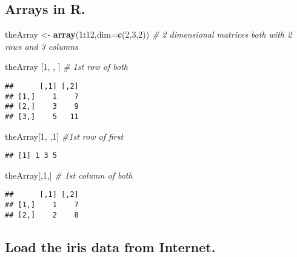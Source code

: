 \documentclass[
]{article}
\newenvironment{Shaded}{\begin{snugshade}}{\end{snugshade}}
\newcommand{\AttributeTok}[1]{\textcolor[rgb]{0.13,0.29,0.53}{#1}}
\newcommand{\CommentTok}[1]{\textcolor[rgb]{0.56,0.35,0.01}{\textit{#1}}}
\newcommand{\DecValTok}[1]{\textcolor[rgb]{0.00,0.00,0.81}{#1}}
\newcommand{\FunctionTok}[1]{\textcolor[rgb]{0.13,0.29,0.53}{\textbf{#1}}}
\newcommand{\NormalTok}[1]{#1}
\newcommand{\OtherTok}[1]{\textcolor[rgb]{0.56,0.35,0.01}{#1}}
\newcommand{\SpecialCharTok}[1]{\textcolor[rgb]{0.81,0.36,0.00}{\textbf{#1}}}
\begin{document}
\subsection{Arrays in R.}\label{arrays-in-r.}

\begin{Shaded}
\begin{Highlighting}[]
\NormalTok{theArray }\OtherTok{\textless{}{-}} \FunctionTok{array}\NormalTok{(}\DecValTok{1}\SpecialCharTok{:}\DecValTok{12}\NormalTok{,}\AttributeTok{dim=}\FunctionTok{c}\NormalTok{(}\DecValTok{2}\NormalTok{,}\DecValTok{3}\NormalTok{,}\DecValTok{2}\NormalTok{))}
\CommentTok{\# 2 dimensional matrices both with 2 rows and 3 columns}

\NormalTok{theArray [}\DecValTok{1}\NormalTok{, , ] }\CommentTok{\# 1st row of both}
\end{Highlighting}
\end{Shaded}

\begin{verbatim}
##      [,1] [,2]
## [1,]    1    7
## [2,]    3    9
## [3,]    5   11
\end{verbatim}

\begin{Shaded}
\begin{Highlighting}[]
\NormalTok{theArray[}\DecValTok{1}\NormalTok{, ,}\DecValTok{1}\NormalTok{] }\CommentTok{\#1st row of first}
\end{Highlighting}
\end{Shaded}

\begin{verbatim}
## [1] 1 3 5
\end{verbatim}

\begin{Shaded}
\begin{Highlighting}[]
\NormalTok{theArray[,}\DecValTok{1}\NormalTok{,] }\CommentTok{\# 1st column of both}
\end{Highlighting}
\end{Shaded}

\begin{verbatim}
##      [,1] [,2]
## [1,]    1    7
## [2,]    2    8
\end{verbatim}

\subsection{Load the iris data from
Internet.}\label{load-the-iris-data-from-internet.}
\end{document}
